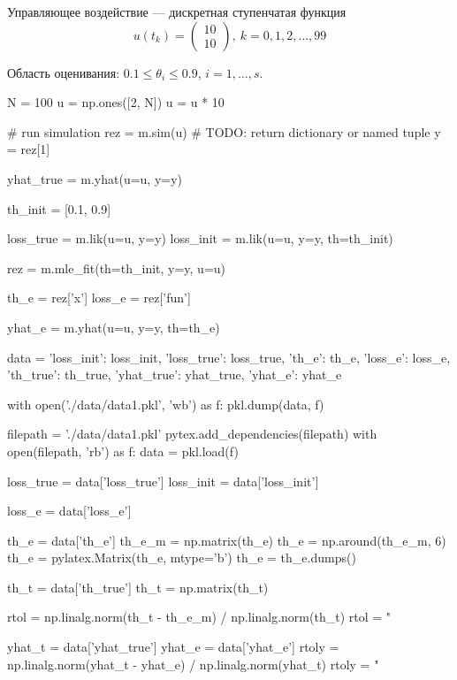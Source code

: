 \documentclass[a4paper,14pt]{extarticle}
\begin{document}
\indent Управляющее воздействие --- дискретная ступенчатая функция
\[
  u(t_k) = \begin{pmatrix} 10 \\ 10 \end{pmatrix},\ k = 0, 1, 2, \ldots, 99
\]

Область оценивания: $0.1 \le \theta_i \le 0.9$, $i = 1, \ldots, s$.

\begin{pycode}[model1]
N = 100
u = np.ones([2, N])
u = u * 10

# run simulation
rez = m.sim(u)  # TODO: return dictionary or named tuple
y = rez[1]

yhat_true = m.yhat(u=u, y=y)

th_init = [0.1, 0.9]

loss_true = m.lik(u=u, y=y)
loss_init = m.lik(u=u, y=y, th=th_init)

rez = m.mle_fit(th=th_init, y=y, u=u)

th_e = rez['x']
loss_e = rez['fun']

yhat_e = m.yhat(u=u, y=y, th=th_e)

data = {'loss_init': loss_init,
        'loss_true': loss_true,
        'th_e': th_e,
        'loss_e': loss_e,
        'th_true': th_true,
        'yhat_true': yhat_true,
        'yhat_e': yhat_e}

with open('./data/data1.pkl', 'wb') as f:
  pkl.dump(data, f)
\end{pycode}

\begin{pycode}
filepath = './data/data1.pkl'
pytex.add_dependencies(filepath)
with open(filepath, 'rb') as f:
    data = pkl.load(f)

loss_true = data['loss_true']
loss_init = data['loss_init']

loss_e = data['loss_e']

th_e = data['th_e']
th_e_m = np.matrix(th_e)
th_e = np.around(th_e_m, 6)
th_e = pylatex.Matrix(th_e, mtype='b')
th_e = th_e.dumps()

th_t = data['th_true']
th_t = np.matrix(th_t)

rtol = np.linalg.norm(th_t - th_e_m) / np.linalg.norm(th_t)
rtol = "%

yhat_t = data['yhat_true']
yhat_e = data['yhat_e']
rtoly = np.linalg.norm(yhat_t - yhat_e) / np.linalg.norm(yhat_t)
rtoly = "%
\end{pycode}
\end{document}
